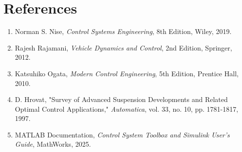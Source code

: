 \documentclass[12pt,a4paper]{article}
\begin{document}
\vfill

\section*{References}

\begin{enumerate}
    \item Norman S. Nise, \textit{Control Systems Engineering}, 8th Edition, Wiley, 2019.
    \item Rajesh Rajamani, \textit{Vehicle Dynamics and Control}, 2nd Edition, Springer, 2012.
    \item Katsuhiko Ogata, \textit{Modern Control Engineering}, 5th Edition, Prentice Hall, 2010.
    \item D. Hrovat, "Survey of Advanced Suspension Developments and Related Optimal Control Applications," \textit{Automatica}, vol. 33, no. 10, pp. 1781-1817, 1997.
    \item MATLAB Documentation, \textit{Control System Toolbox and Simulink User's Guide}, MathWorks, 2025.
\end{enumerate}
\end{document}

